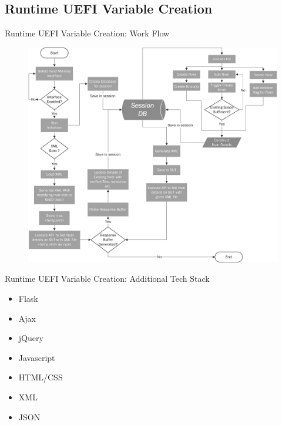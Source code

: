 \subsection{Runtime UEFI Variable Creation}
\begin{frame}{Runtime UEFI Variable Creation: Work Flow}
  \begin{figure}[htbp]
    \centering
    \includegraphics[width=0.6\linewidth]{Im/figures/nvar_web_GUI_flow}
  \end{figure}
\end{frame}


\begin{frame}{Runtime UEFI Variable Creation: Additional Tech Stack}
  \begin{itemize}
    \item Flask
    \item Ajax
    \item jQuery
    \item Javascript
    \item HTML/CSS
    \item XML
    \item JSON
  \end{itemize}
\end{frame}

